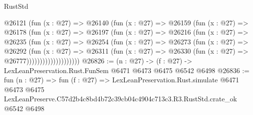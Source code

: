 \begin{lexlean}{RustStd}
\begin{coremodule}
                  @26121
                    (fun (x : @27) =>
                    @26140
                      (fun (x : @27) =>
                      @26159
                        (fun (x : @27) =>
                        @26178
                          (fun (x : @27) =>
                          @26197
                            (fun (x : @27) =>
                            @26216
                              (fun (x : @27) =>
                              @26235
                                (fun (x : @27) =>
                                @26254
                                  (fun (x : @27) =>
                                  @26273
                                    (fun (x : @27) =>
                                    @26292
                                      (fun (x : @27) =>
                                      @26311
                                        (fun (x : @27) =>
                                        @26330 (fun (x : @27) => @26777))))))))))))))))))))
@26826 := (n : @27) -> (f : @27) -> LexLeanPreservation.Rust.FunSem @6471 @6473 @6475 @6542 @6498
@26836 := fun (n : @27) =>
  fun (f : @27) =>
  LexLeanPreservation.Rust.simulate
    @6471
    @6473
    @6475
    LexLeanPreserve.C57d2b4c8bd4b72c39cb04c4904c713c3.R3.RustStd.crate_ok
    @6542
    @6498
\end{coremodule}
\end{lexlean}
